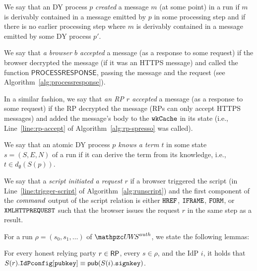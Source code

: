 \begin{definition}\label{def:creating}
  We say that an DY process $p$ \emph{created} a message $m$ (at
  some point) in a run if $m$ is derivably contained in a message
  emitted by $p$ in some processing step and if there is no earlier
  processing step where $m$ is derivably contained in a message
  emitted by some DY process $p'$.
\end{definition}


\begin{definition}\label{def:accepting}
  We say that \emph{a browser $b$ accepted} a message (as a response
  to some request) if the browser decrypted the message (if it was an
  HTTPS message) and called the function $\mathsf{PROCESSRESPONSE}$,
  passing the message and the request (see
  Algorithm~\ref{alg:processresponse}).
\end{definition}

\begin{definition}\label{def:rp-accepting}
  In a similar fashion, we say that \emph{an RP $r$ accepted} a
  message (as a response to some request) if the RP decrypted the
  message (RPs can only accept HTTPS messages) and added the message's
  body to the $\mathtt{wkCache}$ in its state (i.e.,
  Line~\ref{line:rp-accept} of Algorithm~\ref{alg:rp-spresso} was called).
\end{definition}


\begin{definition}\label{def:knowing}
  We say that an atomic DY process \emph{$p$ knows a term $t$} in some
  state $s=(S,E,N)$ of a run if it can derive the term from its
  knowledge, i.e., $t \in d_{\emptyset}(S(p))$.
\end{definition}


\begin{definition}\label{def:initiating}
  We say that a \emph{script initiated a request $r$} if a browser
  triggered the script (in Line~\ref{line:trigger-script} of
  Algorithm~\ref{alg:runscript}) and the first component of the
  $\mathit{command}$ output of the script relation is either $\mathtt{HREF}$, 
  $\mathtt{IFRAME}$, $\mathtt{FORM}$, or $\mathtt{XMLHTTPREQUEST}$ such that the browser
  issues the request $r$ in the same step as a result.
\end{definition}
  
  For a run $\rho = (s_0, s_1,\dots)$ of $\uppressoauthwebsystem$, we state the following lemmas:
 
 \begin{lemma}\label{lemma:rp-correct-idppubkey}
 For every honest relying party $r \in \mathsf{RP}$, every $s \in \rho$, and the IdP $i$, it holds that $S(r).\mathtt{IdPconfig}[\mathtt{pubkey}] \equiv \mathsf{pub}(S(i).\mathtt{signkey})$.
 \end{lemma}
 
